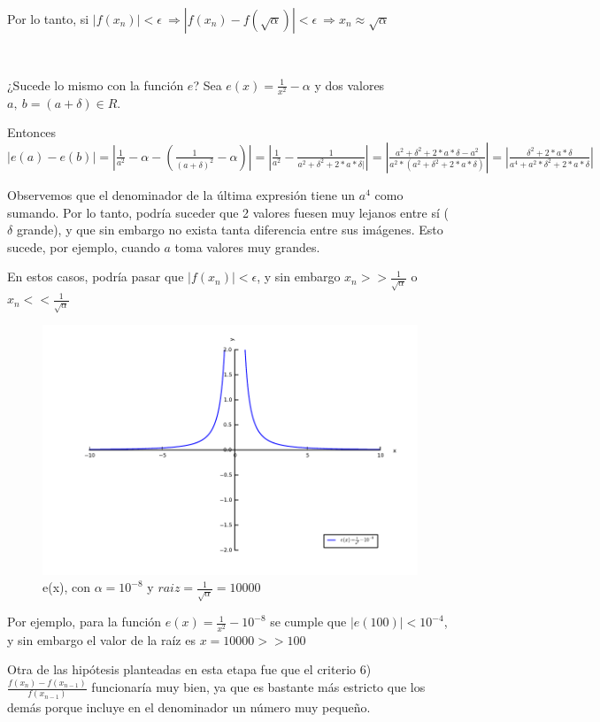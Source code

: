Por lo tanto, si $|f(x_{n})| < \epsilon \ \Rightarrow |f(x_{n}) - f(\sqrt{\alpha})| < \epsilon \ \Rightarrow x_{n} \approx \sqrt{\alpha}$

~

¿Sucede lo mismo con la función $e$? Sea $e(x) = \frac{1}{x^{2}} - \alpha$ y dos valores $a, \ b=(a+\delta) \in R$. 

Entonces $|e(a) - e(b)| = |\frac{1}{a^{2}} - \alpha - (\frac{1}{(a+\delta)^{2}} - \alpha) | =
|\frac{1}{a^{2}} - \frac{1}{a^{2}+\delta^{2}+2*a*\delta|} | = | \frac{a^{2}+\delta^{2}+2*a*\delta-a^{2}}{a^{2}*(a^{2}+\delta^{2}+2*a*\delta)} | = |\frac{\delta^{2}+2*a*\delta}{a^{4}+a^{2}*\delta^{2}+2*a*\delta}|$

Observemos que el denominador de la última expresión tiene un $a^{4}$ como sumando. Por lo tanto, podría suceder que 2 valores fuesen muy lejanos entre sí ($\delta$ grande), y que sin embargo no exista
tanta diferencia entre sus imágenes. Esto sucede, por ejemplo, cuando $a$ toma valores muy grandes.

En estos casos, podría pasar que $|f(x_{n})| < \epsilon$, y sin embargo $x_{n} >> \frac{1}{\sqrt{\alpha}}$ o $x_{n} << \frac{1}{\sqrt{\alpha}}$

\begin{figure}[!h]
	\begin{center}
		  \includegraphics[keepaspectratio]{../Imagenes/exp3/raiz_10000.pdf}
		  \caption{e(x), con $\alpha=10^{-8}$ y $raiz=\frac{1}{\sqrt{\alpha}}=10000$ }
		  \label{fig:contra1}
	\end{center}
\end{figure}
\FloatBarrier

Por ejemplo, para la función $e(x)=\frac{1}{x^2}-10^{-8}$ se cumple que $|e(100)| < 10^{-4}$, y sin embargo el valor de la raíz es $x=10000 >> 100$

Otra de las hipótesis planteadas en esta etapa fue que el criterio 6) $\frac{f(x_{n})-f(x_{n-1})}{f(x_{n-1})}$ funcionaría muy bien, ya que es bastante más estricto que los demás porque incluye en el denominador
un número muy peque\~no.














